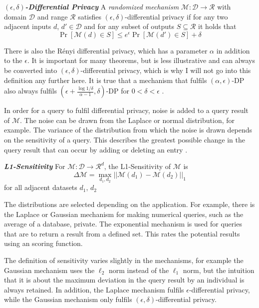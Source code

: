 \begin{definition}\label{def:eps-delta-differential-privacy}
	\emph{\textbf{$(\epsilon, \delta)$-Differential Privacy}} A \textit{randomized mechanism} $\mathcal{M}: \mathcal{D} \rightarrow \mathcal{R}$ with domain $\mathcal{D}$ and range $\mathcal{R}$ satisfies $(\epsilon, \delta)$-differential privacy if for any two adjacent inputs $d$, $d' \in \mathcal{D}$ and for any subset of outputs $S \subseteq \mathcal{R}$ it holds that $$\Pr[\mathcal{M}(d) \in S] \leq e^{\epsilon} \Pr[\mathcal{M}(d') \in S] + \delta$$
\end{definition}

There is also the Rényi differential privacy, which has a parameter $\alpha$ in addition to the $\epsilon$. It is important for many theorems, but is less illustrative and can always be converted into $(\epsilon, \delta)$-differential privacy, which is why I will not go into this definition any further here. It is true that a mechanism that fulfils $(\alpha, \epsilon)$-DP also always fulfils $(\epsilon + \frac{\log 1 / \delta}{\alpha - 1}, \delta)$-DP for $0 < \delta < \epsilon$ \cite{mironov:2017}.

In order for a query to fulfil differential privacy, noise is added to a query result of $\mathcal{M}$. The noise can be drawn from the Laplace or normal distribution, for example. The variance of the distribution from which the noise is drawn depends on the sensitivity of a query. This describes the greatest possible change in the query result that can occur by adding or deleting an entry \cite{dwork:2006}.

\begin{definition}\label{def:l1-sensitivity}
	\emph{\textbf{L1-Sensitivity}} For $\mathcal{M}: \mathcal{D} \rightarrow \mathcal{R}^{d}$, the L1-Sensitivity of $\mathcal{M}$ is 
	$$
	\Delta \mathcal{M} = \max_{d_1, d_2}{||\mathcal{M}(d_1) - \mathcal{M}(d_2)||}_1
	$$
	for all adjacent datasets $d_1$, $d_2$
\end{definition}

The distributions are selected depending on the application. For example, there is the Laplace or Gaussian mechanism for making numerical queries, such as the average of a database, private. The exponential mechanism is used for queries that are to return a result from a defined set. This rates the potential results using an scoring function.\cite{mcsherry:2007}

The definition of sensitivity varies slightly in the mechanisms, for example the Gaussian mechanism uses the $\ell_2$ norm instead of the $\ell_1$ norm, but the intuition that it is about the maximum deviation in the query result by an individual is always retained. In addition, the Laplace mechanism fulfils $\epsilon$-differential privacy, while the Gaussian mechanism only fulfils $(\epsilon, \delta)$-differential privacy.\cite[p.261ff]{dwork:2014}


